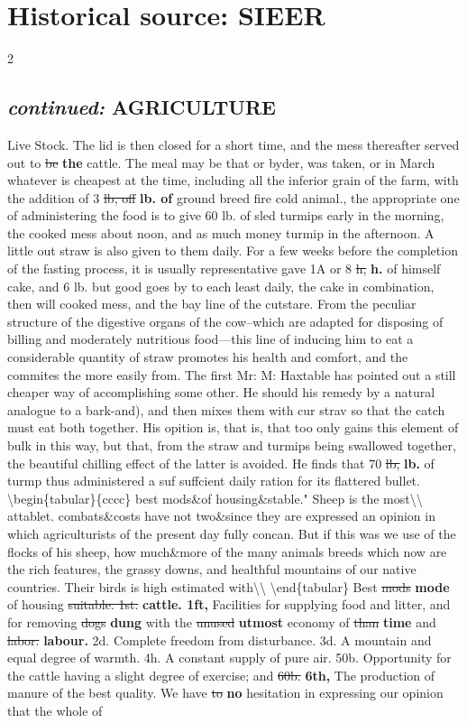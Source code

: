 \documentclass[10pt]{article}
\begin{document}
\section*{Historical source: SIEER}
\begin{multicols}{2}
\subsection*{\textit{continued:} AGRICULTURE}
Live Stock. The lid is then closed for a short time, and the mess thereafter served out to \sout{be} \textbf{the} cattle. The meal may be that or byder, was taken, or in March whatever is cheapest at the time, including all the inferior grain of the farm, with the addition of 3 \sout{lb, off} \textbf{lb. of} ground breed fire cold animal., the appropriate one of administering the food is to give 60 lb. of sled turmips early in the morning, the cooked mess about noon, and as much money turmip in the afternoon. A little out straw is also given to them daily. For a few weeks before the completion of the fasting process, it is usually representative gave 1A or 8 \sout{h,} \textbf{h.} of himself cake, and 6 lb. but good goes by to each least daily, the cake in combination, then will cooked mess, and the bay line of the cutstare. From the peculiar structure of the digestive organs of the cow--which are adapted for disposing of billing and moderately nutritious food—this line of inducing him to eat a considerable quantity of straw promotes his health and comfort, and the commites the more easily from. The first Mr: M: Haxtable has pointed out a still cheaper way of accomplishing some other. He should his remedy by a natural analogue to a bark-and), and then mixes them with cur strav so that the catch must eat both together. His opition is, that is, that too only gains this element of bulk in this way, but that, from the straw and turmips being swallowed together, the beautiful chilling effect of the latter is avoided. He finds that 70 \sout{lb,} \textbf{lb.} of turmp thus administered a suf suffcient daily ration for its flattered bullet. \textbackslash{}begin\{tabular\}\{cccc\} best mods\&of housing\&stable." Sheep is the most\textbackslash{}\textbackslash{} attablet. combats\&costs have not two\&since they are expressed an opinion in which agriculturists of the present day fully concan. But if this was we use of the flocks of his sheep, how much\&more of the many animals breeds which now are the rich features, the grassy downs, and healthful mountains of our native countries. Their birds is high estimated with\textbackslash{}\textbackslash{} \textbackslash{}end\{tabular\} Best \sout{mods} \textbf{mode} of housing \sout{suitable. 1st.} \textbf{cattle. 1ft,} Facilities for supplying food and litter, and for removing \sout{dogs} \textbf{dung} with the \sout{unused} \textbf{utmost} economy of \sout{than} \textbf{time} and \sout{labor.} \textbf{labour.} 2d. Complete freedom from disturbance. 3d. A mountain and equal degree of warmth. 4h. A constant supply of pure air. 50b. Opportunity for the cattle having a slight degree of exercise; and \sout{60b.} \textbf{6th,} The production of manure of the best quality. We have \sout{to} \textbf{no} hesitation in expressing our opinion that the whole of 
\end{multicols}
\end{document}
